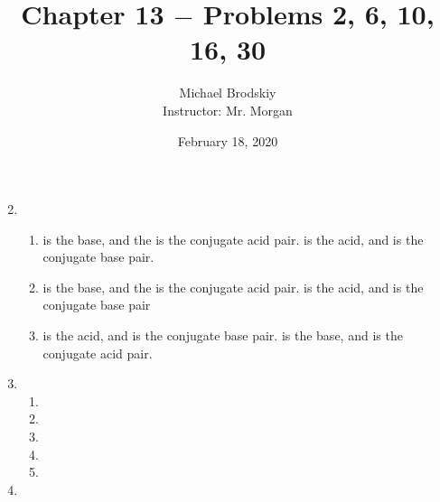 \documentclass[12pt]{article}
\title{Chapter 13 $-$ Problems 2, 6, 10, 16, 30}
\date{February 18, 2020}
\author{Michael Brodskiy\\ \small Instructor: Mr. Morgan}
\begin{document}
\maketitle

\begin{enumerate}

    \setcounter{enumi}{1}

      \item 

        \begin{enumerate}

          \item {} is the base, and the  is the conjugate acid pair.  is the acid, and  is the conjugate base pair.

          \item {} is the base, and the  is the conjugate acid pair.  is the acid, and  is the conjugate base pair

          \item {} is the acid, and  is the conjugate base pair.  is the base, and  is the conjugate acid pair.

        \end{enumerate}

    \setcounter{enumi}{5}

      \item 

        \begin{enumerate}

          \item {} 

          \item {}

          \item {}

          \item {}

          \item {}

        \end{enumerate}

    \setcounter{enumi}{9}

      \item 

        \begin{enumerate}


\end{enumerate}
\end{enumerate}
\end{document}
